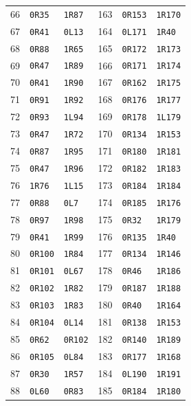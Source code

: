 {\begin{longtable}{@{}rll@{\qquad\quad}rll@{}}
66 & \texttt{0R35} & \texttt{1R87} & 163 & \texttt{0R153} & \texttt{1R170}\\
67 & \texttt{0R41} & \texttt{0L13} & 164 & \texttt{0L171} & \texttt{1R40}\\
68 & \texttt{0R88} & \texttt{1R65} & 165 & \texttt{0R172} & \texttt{1R173}\\
69 & \texttt{0R47} & \texttt{1R89} & 166 & \texttt{0R171} & \texttt{1R174}\\
70 & \texttt{0R41} & \texttt{1R90} & 167 & \texttt{0R162} & \texttt{1R175}\\
71 & \texttt{0R91} & \texttt{1R92} & 168 & \texttt{0R176} & \texttt{1R177}\\
72 & \texttt{0R93} & \texttt{1L94} & 169 & \texttt{0R178} & \texttt{1L179}\\
73 & \texttt{0R47} & \texttt{1R72} & 170 & \texttt{0R134} & \texttt{1R153}\\
74 & \texttt{0R87} & \texttt{1R95} & 171 & \texttt{0R180} & \texttt{1R181}\\
75 & \texttt{0R47} & \texttt{1R96} & 172 & \texttt{0R182} & \texttt{1R183}\\
76 & \texttt{1R76} & \texttt{1L15} & 173 & \texttt{0R184} & \texttt{1R184}\\
77 & \texttt{0R88} & \texttt{0L7} & 174 & \texttt{0R185} & \texttt{1R176}\\
78 & \texttt{0R97} & \texttt{1R98} & 175 & \texttt{0R32} & \texttt{1R179}\\
79 & \texttt{0R41} & \texttt{1R99} & 176 & \texttt{0R135} & \texttt{1R40}\\
80 & \texttt{0R100} & \texttt{1R84} & 177 & \texttt{0R134} & \texttt{1R146}\\
81 & \texttt{0R101} & \texttt{0L67} & 178 & \texttt{0R46} & \texttt{1R186}\\
82 & \texttt{0R102} & \texttt{1R82} & 179 & \texttt{0R187} & \texttt{1R188}\\
83 & \texttt{0R103} & \texttt{1R83} & 180 & \texttt{0R40} & \texttt{1R164}\\
84 & \texttt{0R104} & \texttt{0L14} & 181 & \texttt{0R138} & \texttt{1R153}\\
85 & \texttt{0R62} & \texttt{0R102} & 182 & \texttt{0R140} & \texttt{1R189}\\
86 & \texttt{0R105} & \texttt{0L84} & 183 & \texttt{0R177} & \texttt{1R168}\\
87 & \texttt{0R30} & \texttt{1R57} & 184 & \texttt{0L190} & \texttt{1R191}\\
88 & \texttt{0L60} & \texttt{0R83} & 185 & \texttt{0R184} & \texttt{1R180}\\

\end{longtable}}
